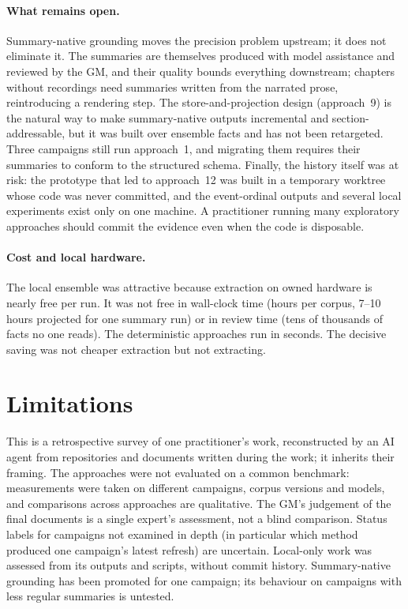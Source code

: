 \documentclass[11pt]{article}
\begin{document}
\paragraph{What remains open.}
Summary-native grounding moves the precision problem upstream; it does not eliminate it. The summaries
are themselves produced with model assistance and reviewed by the GM, and their quality bounds
everything downstream; chapters without recordings need summaries written from the narrated prose,
reintroducing a rendering step. The store-and-projection design (approach~9) is the natural way to make
summary-native outputs incremental and section-addressable, but it was built over ensemble facts and
has not been retargeted. Three campaigns still run approach~1, and migrating them requires their
summaries to conform to the structured schema. Finally, the history itself was at risk: the prototype
that led to approach~12 was built in a temporary worktree whose code was never committed, and the
event-ordinal outputs and several local experiments exist only on one machine. A practitioner running
many exploratory approaches should commit the evidence even when the code is disposable.

\paragraph{Cost and local hardware.}
The local ensemble was attractive because extraction on owned hardware is nearly free per run. It
was not free in wall-clock time (hours per corpus, 7--10 hours projected for one summary run) or in
review time (tens of thousands of facts no one reads). The deterministic approaches run in seconds.
The decisive saving was not cheaper extraction but not extracting.

\section{Limitations}
This is a retrospective survey of one practitioner's work, reconstructed by an AI agent from
repositories and documents written during the work; it inherits their framing. The approaches were not
evaluated on a common benchmark: measurements were taken on different campaigns, corpus versions and
models, and comparisons across approaches are qualitative. The GM's judgement of the final documents is
a single expert's assessment, not a blind comparison. Status labels for campaigns not examined in depth
(in particular which method produced one campaign's latest refresh) are uncertain. Local-only work was
assessed from its outputs and scripts, without commit history. Summary-native grounding has been
promoted for one campaign; its behaviour on campaigns with less regular summaries is untested.
\end{document}

